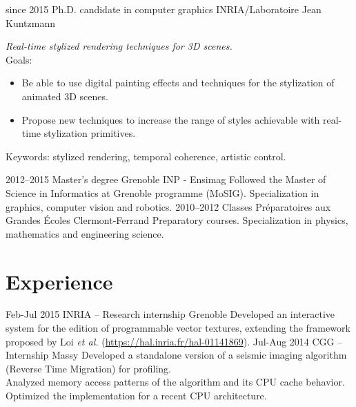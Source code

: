 \documentclass[]{friggeri-cv}
\begin{document}
\begin{entrylist}
  \entry
    {since 2015}
    {Ph.D. candidate in computer graphics}
    {INRIA/Laboratoire Jean Kuntzmann}
    {\emph{Real-time stylized rendering techniques for 3D scenes.}\\ Goals:
    \begin{itemize} 	\item Be able to use digital painting effects and techniques for the stylization of animated 3D scenes.
    \item Propose new techniques to increase the range of styles achievable with real-time stylization primitives.
    \end{itemize}
    Keywords: stylized rendering, temporal coherence, artistic control.}
  \entry
    {2012–2015}
    {Master's degree}
    {Grenoble INP - Ensimag}
    {Followed the Master of Science in Informatics at Grenoble programme (MoSIG). Specialization in graphics, computer vision and robotics.}
  \entry
    {2010–2012}
    {Classes Préparatoires aux Grandes Écoles}
    {Clermont-Ferrand}
    {Preparatory courses. Specialization in physics, mathematics and engineering science.}
 
\end{entrylist}

\section{Experience}

\begin{entrylist}
   \entry
    {Feb-Jul 2015}
    {INRIA – Research internship}
    {Grenoble}
    {
    Developed an interactive system for the edition of programmable vector textures, extending the framework proposed by Loi \emph{et al.} (\href{https://hal.inria.fr/hal-01141869}{https://hal.inria.fr/hal-01141869}).
}
  \entry
    {Jul-Aug 2014}
    {CGG – Internship}
    {Massy}
    {Developed a standalone version of a seismic imaging algorithm (Reverse Time Migration) for profiling.\\
    	Analyzed memory access patterns of the algorithm and its CPU cache behavior. Optimized the implementation for a recent CPU architecture.}
    	
\end{entrylist}
\end{document}
